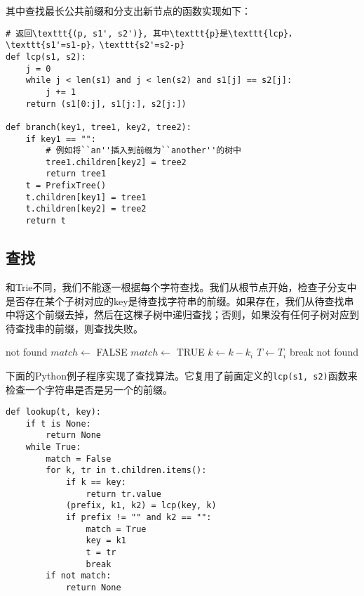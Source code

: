\documentclass[UTF8]{article}
\begin{document}
其中查找最长公共前缀和分支出新节点的函数实现如下：

\begin{lstlisting}
# 返回\texttt{(p, s1', s2')}, 其中\texttt{p}是\texttt{lcp}，\texttt{s1'=s1-p}，\texttt{s2'=s2-p}
def lcp(s1, s2):
    j = 0
    while j < len(s1) and j < len(s2) and s1[j] == s2[j]:
        j += 1
    return (s1[0:j], s1[j:], s2[j:])

def branch(key1, tree1, key2, tree2):
    if key1 == "":
        # 例如将``an''插入到前缀为``another''的树中
        tree1.children[key2] = tree2
        return tree1
    t = PrefixTree()
    t.children[key1] = tree1
    t.children[key2] = tree2
    return t
\end{lstlisting}


\subsection{查找}

和Trie不同，我们不能逐一根据每个字符查找。我们从根节点开始，检查子分支中是否存在某个子树对应的key是待查找字符串的前缀。如果存在，我们从待查找串中将这个前缀去掉，然后在这棵子树中递归查找；否则，如果没有任何子树对应到待查找串的前缀，则查找失败。

\begin{algorithmic}[1]
     \State \Return not found
   \EndIf
  \Repeat
    \State $match \gets$ FALSE
        \State \Return {}
      \EndIf
        \State $match \gets$ TRUE
        \State $k \gets k - k_i$
        \State $T \gets T_i$
        \State break
      \EndIf
    \EndFor
  \State \Return not found
\EndFunction
\end{algorithmic}

下面的Python例子程序实现了查找算法。它复用了前面定义的\texttt{lcp(s1, s2)}函数来检查一个字符串是否是另一个的前缀。

\lstset{language=Python}
\begin{lstlisting}
def lookup(t, key):
    if t is None:
        return None
    while True:
        match = False
        for k, tr in t.children.items():
            if k == key:
                return tr.value
            (prefix, k1, k2) = lcp(key, k)
            if prefix != "" and k2 == "":
                match = True
                key = k1
                t = tr
                break
        if not match:
            return None
\end{lstlisting}
\end{document}
